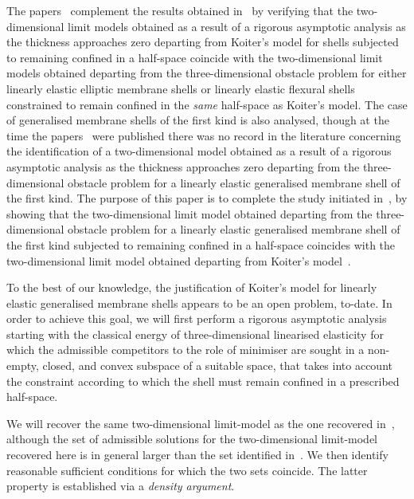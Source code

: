 \documentclass{amsart}
\begin{document}
The papers~\cite{CiaPie2018b,CiaPie2018bCR} complement the results obtained in~\cite{CiaMarPie2018b,CiaMarPie2018,PieJDE2022,Pie2023} by verifying that the two-dimensional limit models obtained as a result of a rigorous asymptotic analysis as the thickness approaches zero departing from Koiter's model for shells subjected to remaining confined in a half-space coincide with the two-dimensional limit models obtained departing from the three-dimensional obstacle problem for either linearly elastic elliptic membrane shells or linearly elastic flexural shells constrained to remain confined in the \emph{same} half-space as Koiter's model. The case of generalised membrane shells of the first kind is also analysed, though at the time the papers~\cite{CiaPie2018b,CiaPie2018bCR} were published there was no record in the literature concerning the identification of a two-dimensional model  obtained as a result of a rigorous asymptotic analysis as the thickness approaches zero departing from the three-dimensional obstacle problem for a linearly elastic generalised membrane shell of the first kind. The purpose of this paper is to complete the study initiated in~\cite{CiaPie2018b,CiaPie2018bCR,CiaMarPie2018b,CiaMarPie2018,PieJDE2022,Pie2023}, by showing that the two-dimensional limit model obtained departing from the three-dimensional obstacle problem for a linearly elastic generalised membrane shell of the first kind subjected to remaining confined in a half-space coincides with the two-dimensional limit model obtained departing from Koiter's model~\cite{CiaPie2018b,CiaPie2018bCR}.

To the best of our knowledge, the justification of Koiter's model for linearly elastic generalised membrane shells appears to be an open problem, to-date. In order to achieve this goal, we will first perform a rigorous asymptotic analysis starting with the classical energy of three-dimensional linearised elasticity for which the admissible competitors to the role of minimiser are sought in a non-empty, closed, and convex subspace of a suitable space, that takes into account the constraint according to which the shell must remain confined in a prescribed half-space.

We will recover the same two-dimensional limit-model as the one recovered in~\cite{CiaPie2018b}, although the set of admissible solutions for the two-dimensional limit-model recovered here is in general larger than the set identified in~\cite{CiaPie2018b}. We then identify reasonable sufficient conditions for which the two sets coincide. The latter property is established via a \emph{density argument}.
\end{document}
